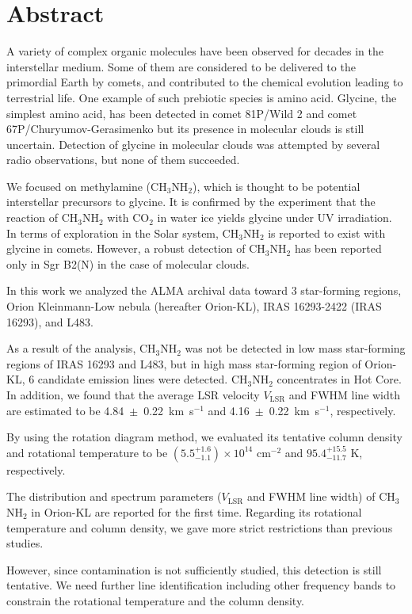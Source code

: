 \chapter*{Abstract}

\singlespacing

A variety of complex organic molecules have been observed for decades in the interstellar medium.
Some of them are considered to be delivered to the primordial Earth by comets, 
and contributed to the chemical evolution leading to terrestrial life.
One example of such prebiotic species is amino acid. Glycine, the simplest amino acid, 
has been detected in comet 81P/Wild 2 and comet 67P/Churyumov-Gerasimenko but its presence in molecular clouds 
is still uncertain. Detection of glycine in molecular clouds was attempted by several radio observations, 
but none of them succeeded.

We focused on methylamine (CH$_3$NH$_2$), which is thought to be potential interstellar precursors to glycine. 
It is confirmed by the experiment that the reaction of CH$_3$NH$_2$ with CO$_2$ in water ice 
yields glycine under UV irradiation. 
In terms of exploration in the Solar system, CH$_3$NH$_2$ is reported to exist with glycine in comets. 
However, a robust detection of CH$_3$NH$_2$ has been reported only in Sgr B2(N) in the case of molecular clouds.

In this work we analyzed the ALMA archival data toward 3 star-forming regions, 
Orion Kleinmann-Low nebula (hereafter Orion-KL), IRAS 16293-2422 (IRAS 16293), and L483.

As a result of the analysis, CH$_3$NH$_2$ was not be detected in low mass star-forming regions of IRAS 16293 and L483, 
but in high mass star-forming region of Orion-KL, 6 candidate emission lines were detected.
CH$_3$NH$_2$ concentrates in Hot Core. In addition, we found that the average LSR velocity $V_{\mathrm{LSR}}$ and FWHM line width are estimated to be 4.84~$\pm$~0.22~km~s$^{-1}$ 
and 4.16~$\pm$~0.22~km~s$^{-1}$, respectively. 

By using the rotation diagram method, we evaluated its tentative column density 
and rotational temperature to be $(5.5^{+1.6}_{-1.1} ) \times 10^{14}$ cm$^{-2}$ and $95.4^{+15.5}_{-11.7} \,\,\mathrm{K}$, respectively. 

The distribution and spectrum parameters ($V_{\mathrm{LSR}}$ and FWHM line width) of CH$_3$NH$_2$ in Orion-KL are reported for the first time.
Regarding its rotational temperature and column density, we gave more strict restrictions than previous studies.

However, since contamination is not sufficiently studied, this detection is still tentative.
We need further line identification including other frequency bands to constrain the rotational temperature and the column density.

\doublespacing